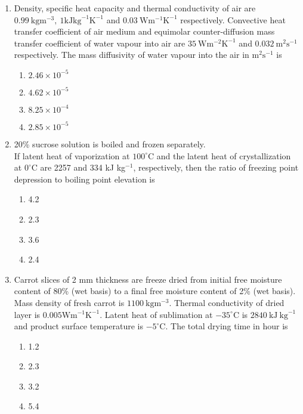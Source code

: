 \documentclass[journal]{IEEEtran}
\numberwithin{equation}{enumi}
\numberwithin{figure}{enumi}
\begin{document}
\begin{enumerate}
\item Density, specific heat capacity and thermal conductivity of air are $0.99~\text{kg}\text{m}^{-3},~1\text{kJ}\text{kg}^{-1}\text{K}^{-1}$ and $0.03~\text{W}\text{m}^{-1}\text{K}^{-1}$ respectively. Convective heat transfer coefficient of air medium and equimolar counter-diffusion mass transfer coefficient of water vapour into air are $35~\text{W}\text{m}^{-2}\text{K}^{-1}$ and $0.032~\text{m}^{2}\text{s}^{-1}$ respectively. The mass diffusivity of water vapour into the air in $\text{m}^2\text{s}^{-1}$ is 
\hfill{}
\begin{multicols}{4}
    \begin{enumerate}
    \item $2.46 \times 10^{-5}$
    \item $4.62 \times 10^{-5}$
    \item $8.25 \times 10^{-4}$
    \item  $2.85 \times 10^{-5}$
    \end{enumerate}
    \end{multicols}  




\item 20\% sucrose solution is boiled and frozen separately.\\
If latent heat of vaporization at $100^\circ$C and the latent heat of crystallization at $0^\circ$C are 2257 and 334 kJ kg$^{-1}$, respectively, then the ratio of freezing point depression to boiling point elevation is 
\hfill{}
\begin{multicols}{4}
    \begin{enumerate}
    \item 4.2
    \item 2.3 
    \item 3.6
    \item 2.4
    \end{enumerate}
    \end{multicols}  




\item Carrot slices of 2 mm thickness are freeze dried from initial free moisture content of 80\% (wet basis) to a final free moisture content of 2\% (wet basis). Mass density of fresh carrot is $1100~\text{kg}\text{m}^{-3}$. Thermal conductivity of dried layer is $0.005\text{W}\text{m}^{-1}\text{K}^{-1}$. Latent heat of sublimation at $-35^\circ$C is $2840~\text{kJ}~\text{kg}^{-1}$ and product surface temperature is $-5^\circ$C. The total drying time in hour is
\hfill{}
\begin{multicols}{4}
    \begin{enumerate}
    \item 1.2
    \item 2.3
    \item  3.2
    \item 5.4
    \end{enumerate}
    \end{multicols}  





\end{enumerate}
\end{document}
